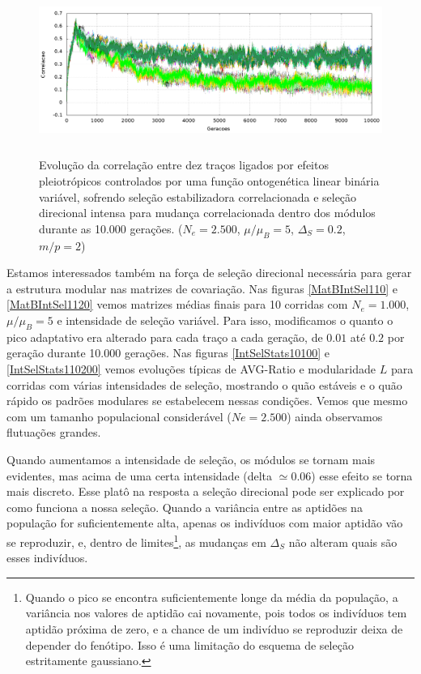 \begin{figure}[htbp]
  \centering
  \includegraphics[width=150mm, height=55mm]{figuras/direcionalRMu5Ne2500IntSel200.png}
  \caption{Evolução da correlação entre dez traços ligados por efeitos
  pleiotrópicos controlados por uma função ontogenética linear binária
  variável, sofrendo seleção estabilizadora correlacionada
  e seleção direcional intensa para mudança correlacionada dentro dos
  módulos durante as 10.000 gerações. 
  ($N_e = 2.500$, $\mu/\mu_B=5$, $\Delta_S=0.2$, $m/p=2$)}
  \label{MatBDirecionalNe2500RMu5}
\end{figure}


Estamos interessados também na força de seleção direcional necessária
para gerar a estrutura modular nas matrizes de covariação. 
Nas figuras \ref{MatBIntSel110} e \ref{MatBIntSel1120} vemos matrizes
médias finais para 10 corridas com $N_e = 1.000$, $\mu/\mu_B=5$ e
intensidade de seleção variável. 
Para isso, modificamos o quanto o pico adaptativo era alterado para cada
traço a cada geração, de $0.01$ até $0.2$ por geração durante 10.000
gerações. 
Nas figuras \ref{IntSelStats10100} e \ref{IntSelStats110200} vemos
evoluções típicas de AVG-Ratio e modularidade $L$ para corridas com
várias intensidades de seleção, mostrando o quão estáveis e o quão
rápido os padrões modulares se estabelecem nessas condições.
Vemos que mesmo com um tamanho populacional considerável ($Ne = 2.500$)
ainda observamos flutuações grandes. 

Quando aumentamos a intensidade de seleção, os módulos se tornam
mais evidentes, mas acima de uma certa intensidade (delta $\simeq 0.06$)
esse efeito se torna mais discreto. 
Esse platô na resposta a seleção direcional pode ser explicado por como
funciona a nossa seleção. 
Quando a variância entre as aptidões na população for suficientemente
alta, apenas os indivíduos com maior aptidão vão se reproduzir, e,
dentro de limites\footnote{ Quando o pico se encontra suficientemente
longe da média da população, a variância nos valores de aptidão cai
novamente, pois todos os indivíduos tem aptidão próxima de zero, e a
chance de um indivíduo se reproduzir deixa de depender do fenótipo. 
Isso é uma limitação do esquema de seleção estritamente gaussiano.}, as
mudanças em $\Delta_S$ não alteram quais são esses indivíduos. 


